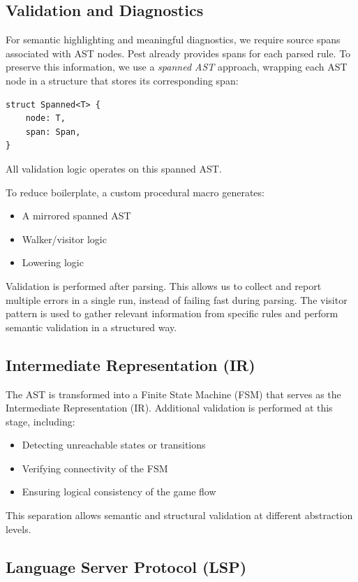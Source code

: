 \documentclass[a4paper,11pt]{article}
\begin{document}
\subsection{Validation and Diagnostics}

For semantic highlighting and meaningful diagnostics, we require source spans associated with AST nodes. Pest already provides spans for each parsed rule. To preserve this information, we use a \emph{spanned AST} approach, wrapping each AST node in a structure that stores its corresponding span:

\begin{verbatim}
struct Spanned<T> {
    node: T,
    span: Span,
}
\end{verbatim}

All validation logic operates on this spanned AST.

To reduce boilerplate, a custom procedural macro generates:
\begin{itemize}
    \item A mirrored spanned AST
    \item Walker/visitor logic
    \item Lowering logic
\end{itemize}

Validation is performed after parsing. This allows us to collect and report multiple errors in a single run, instead of failing fast during parsing. The visitor pattern is used to gather relevant information from specific rules and perform semantic validation in a structured way.

\subsection{Intermediate Representation (IR)}

The AST is transformed into a Finite State Machine (FSM) that serves as the Intermediate Representation (IR). Additional validation is performed at this stage, including:
\begin{itemize}
    \item Detecting unreachable states or transitions
    \item Verifying connectivity of the FSM
    \item Ensuring logical consistency of the game flow
\end{itemize}

This separation allows semantic and structural validation at different abstraction levels.

\subsection{Language Server Protocol (LSP)}
\end{document}
